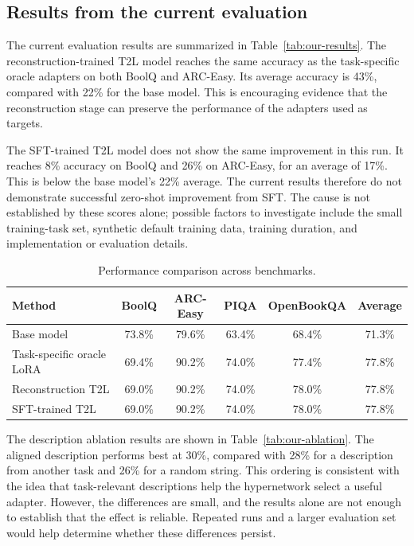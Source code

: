 \documentclass{article}
\begin{document}
\subsection{Results from the current evaluation}

The current evaluation results are summarized in Table~\ref{tab:our-results}. The reconstruction-trained T2L model reaches the same accuracy as the task-specific oracle adapters on both BoolQ and ARC-Easy. Its average accuracy is 43\%, compared with 22\% for the base model. This is encouraging evidence that the reconstruction stage can preserve the performance of the adapters used as targets.

The SFT-trained T2L model does not show the same improvement in this run. It reaches 8\% accuracy on BoolQ and 26\% on ARC-Easy, for an average of 17\%. This is below the base model's 22\% average. The current results therefore do not demonstrate successful zero-shot improvement from SFT. The cause is not established by these scores alone; possible factors to investigate include the small training-task set, synthetic default training data, training duration, and implementation or evaluation details.

\begin{table}[htbp]
    \centering
    \caption{Performance comparison across benchmarks.}
    \label{tab:benchmark-results}
    \begin{tabular}{lccccc}
        \toprule
        Method & BoolQ & ARC-Easy & PIQA & OpenBookQA & Average \\
        \midrule
        Base model & 73.8\% & 79.6\% & 63.4\% & 68.4\% & 71.3\% \\
        Task-specific oracle LoRA & 69.4\% & 90.2\% & 74.0\% & 77.4\% & 77.8\% \\
        Reconstruction T2L & 69.0\% & 90.2\% & 74.0\% & 78.0\% & 77.8\% \\
        SFT-trained T2L & 69.0\% & 90.2\% & 74.0\% & 78.0\% & 77.8\% \\
        \bottomrule
    \end{tabular}
\end{table}

The description ablation results are shown in Table~\ref{tab:our-ablation}. The aligned description performs best at 30\%, compared with 28\% for a description from another task and 26\% for a random string. This ordering is consistent with the idea that task-relevant descriptions help the hypernetwork select a useful adapter. However, the differences are small, and the results alone are not enough to establish that the effect is reliable. Repeated runs and a larger evaluation set would help determine whether these differences persist.
\end{document}
